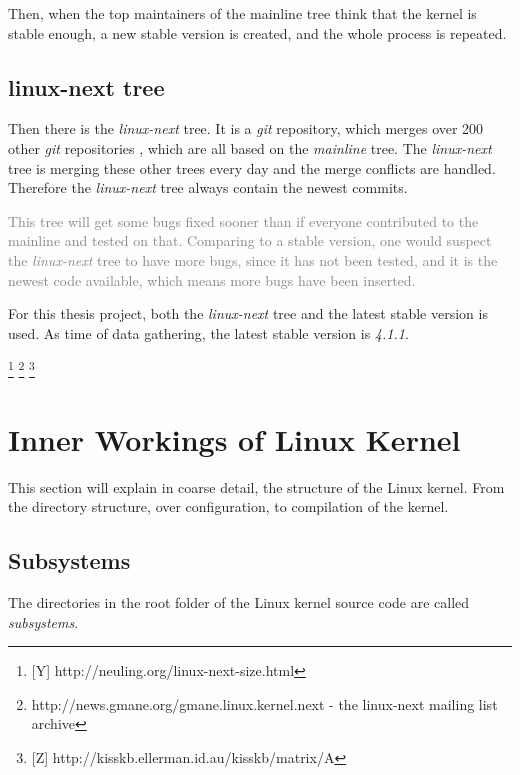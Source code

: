 \documentclass[a4paper,11pt]{report}
\newcommand{\figa}{
    \begin{figure}[!htpb]
    \centering
}
\newcommand{\figb}[2]{
    \caption{#1}
    \label{#2}
    \end{figure}
}
\begin{document}
Then, when the top maintainers of the mainline tree think that the kernel is 
stable enough, a new stable version is created, and the whole process is 
repeated.


        \subsection*{linux-next tree}

Then there is the \emph{linux-next} tree. It is a \emph{git} repository, which 
merges over 200 other \emph{git} repositories
    \cite{nextTrees}
, which 
are all based on the \emph{mainline} tree. The \emph{linux-next} tree is 
merging these other trees every day and the merge conflicts are handled. 
Therefore the \emph{linux-next} tree always contain the newest commits. 

\textcolor{gray}{
This tree will get some bugs fixed sooner than if everyone contributed to the 
mainline and tested on that. Comparing to a stable version, one would suspect 
the \emph{linux-next} tree to have more bugs, since it has not been tested, 
and it is the newest code available, which means more bugs have been inserted.
}

For this thesis project, both the \emph{linux-next} tree and the latest stable 
version is used. As time of data gathering, the latest stable version is 
\emph{4.1.1}.

    \footnote{[Y] http://neuling.org/linux-next-size.html}
    \footnote{http://news.gmane.org/gmane.linux.kernel.next - the linux-next 
        mailing list archive}
    \footnote{[Z] http://kisskb.ellerman.id.au/kisskb/matrix/A}


        \section{Inner Workings of Linux Kernel}

This section will explain in coarse detail, the structure of the Linux kernel.
From the directory structure, over configuration, to compilation of the kernel.


        \subsection{Subsystems}

The directories in the root folder of the Linux kernel source code are called 
\emph{subsystems}. 

\end{document}
